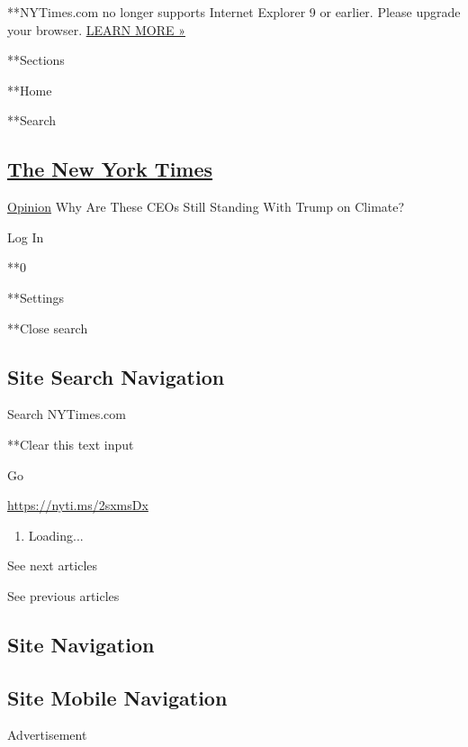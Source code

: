  **NYTimes.com no longer supports Internet Explorer 9 or earlier. Please
upgrade your browser.
\href{http://www.nytimes.com/content/help/site/ie9-support.html}{LEARN
MORE »}

**Sections

**Home

**Search

\hypertarget{the-new-york-times}{%
\subsection{\texorpdfstring{\href{http://www.nytimes.com/}{The New York
Times}}{The New York Times}}\label{the-new-york-times}}

 \href{/section/opinion}{Opinion} \textbar{}Why Are These CEOs Still
Standing With Trump on Climate?

Log In

**0

**Settings

**Close search

\hypertarget{site-search-navigation}{%
\subsection{Site Search Navigation}\label{site-search-navigation}}

Search NYTimes.com

**Clear this text input

Go

\url{https://nyti.ms/2sxmsDx}

\begin{enumerate}
\def\labelenumi{\arabic{enumi}.}
\item
  Loading...
\end{enumerate}

See next articles

See previous articles

\hypertarget{site-navigation}{%
\subsection{Site Navigation}\label{site-navigation}}

\hypertarget{site-mobile-navigation}{%
\subsection{Site Mobile Navigation}\label{site-mobile-navigation}}

Advertisement

